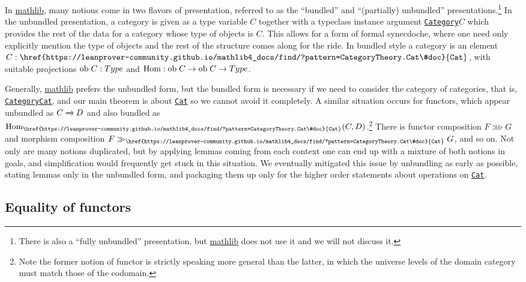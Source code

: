 \documentclass[a4paper,UKenglish,cleveref, autoref, thm-restate]{lipics-v2021}
\newcommand{\ob}{\textup{ob}}
\newcommand{\Hom}{\textup{Hom}}
\newcommand{\1}{\mathbbe{1}}
\newcommand{\2}{\mathbbe{2}}
\newcommand{\3}{\mathbbe{3}}
\newcommand{\rightharpoons}{\mathrel{\mathrlap{\raisebox{0.7pt}{\ensuremath{\rightharpoonup}}}{\raisebox{-0.7pt}{\ensuremath{\rightharpoondown}}}}}
\newcommand{\libmathlib}{\href{https://github.com/leanprover-community/mathlib}{\textsf{mathlib}}}
\newcommand{\cdoc}[2][]{\href{https://leanprover-community.github.io/mathlib4_docs/find/?pattern=CategoryTheory.#1#2\#doc}{\texttt{#2}}}
\begin{document}
In \libmathlib, many notions come in two flavors of presentation, referred to as the ``bundled'' and ``(partially) unbundled'' presentations.\footnote{There is also a ``fully unbundled'' presentation, but \libmathlib{} does not use it and we will not discuss it.} In the unbundled presentation, a category is given as a type variable $C$ together with a typeclass instance argument \texttt{\cdoc{Category}\;$C$} which provides the rest of the data for a category whose type of objects is $C$. This allows for a form of formal synecdoche, where one need only explicitly mention the type of objects and the rest of the structure comes along for the ride. In bundled style a category is an element $C:\cdoc{Cat}$, with suitable projections $\ob\;C:\mathsf{Type}$ and $\Hom:\ob\;C\to\ob\;C\to\mathsf{Type}$.

Generally, \libmathlib{} prefers the unbundled form, but the bundled form is necessary if we need to consider the category of categories, that is, \texttt{\cdoc{Category}\;\cdoc{Cat}}, and our main theorem is about \cdoc{Cat} so we cannot avoid it completely. A similar situation occurs for functors, which appear unbundled as $C\rightharpoons D$ and also bundled as $\Hom_{\cdoc{Cat}}(C,D)$.\footnote{Note the former notion of functor is strictly speaking more general than the latter, in which the universe levels of the domain category must match those of the codomain.} There is functor composition $F\ggg G$ and morphism composition $F\gg_{\cdoc{Cat}} G$, and so on. Not only are many notions duplicated, but by applying lemmas coming from each context one can end up with a mixture of both notions in goals, and simplification would frequently get stuck in this situation. We eventually mitigated this issue by unbundling as early as possible, stating lemmas only in the unbundled form, and packaging them up only for the higher order statements about operations on \cdoc{Cat}.

\subsection{Equality of functors}\label{sec:functor-ext}
\end{document}
